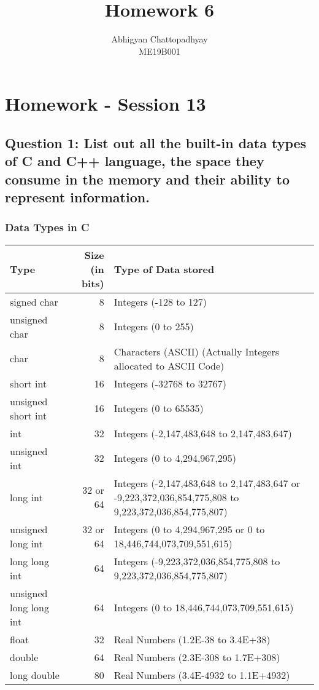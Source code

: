 \documentclass[12pt,a4paper]{article}
\title{Homework 6}
\author{Abhigyan Chattopadhyay \\
	ME19B001
}
\begin{document}
\maketitle
\pagebreak

\section{Homework - Session 13}

\subsection{Question 1: List out all the built-in data types of C and C++ language, the space they consume in the
memory and their ability to represent information.}

\subsubsection{Data Types in C}

\begin{tabular}{|l|r|p{9cm}|}
	\hline
	Type & Size (in bits) & Type of Data stored\\
	\hline 
	signed char & 8 & Integers (-128 to 127)\\
	unsigned char & 8 & Integers (0 to 255)\\
	char & 8 & Characters (ASCII) (Actually Integers allocated to ASCII Code)\\
	short int & 16 & Integers (-32768 to 32767)\\
	unsigned short int & 16 & Integers (0 to 65535)\\
	int & 32 & Integers (-2,147,483,648 to 2,147,483,647)\\
	unsigned int & 32 & Integers (0 to 4,294,967,295)\\
	long int & 32 or 64 & Integers (-2,147,483,648 to 2,147,483,647 or -9,223,372,036,854,775,808 to 9,223,372,036,854,775,807)\\
	unsigned long int & 32 or 64 & Integers (0 to 4,294,967,295 or 0 to 18,446,744,073,709,551,615)\\
	long long int & 64 & Integers (-9,223,372,036,854,775,808 to 9,223,372,036,854,775,807)\\
	unsigned long long int & 64 & Integers (0 to 18,446,744,073,709,551,615)\\
	float & 32 & Real Numbers (1.2E-38 to 3.4E+38)\\
	double & 64 & Real Numbers (2.3E-308 to 1.7E+308)\\
	long double & 80 & Real Numbers (3.4E-4932 to 1.1E+4932)\\
	\hline
\end{tabular}
\end{document}
